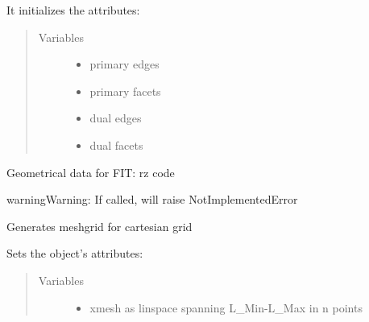 \documentclass[letterpaper,10pt,english]{sphinxmanual}
\begin{document}
\begin{fulllineitems}
\begin{fulllineitems}
It initializes the attributes:
\begin{quote}\begin{description}
\item[{Variables}] \leavevmode\begin{itemize}
\item {} 
 \textendash{} primary edges

\item {} 
 \textendash{} primary facets

\item {} 
 \textendash{} dual edges

\item {} 
 \textendash{} dual facets

\end{itemize}

\end{description}\end{quote}

\end{fulllineitems}


\begin{fulllineitems}
\label{\detokenize{FIT:FIT.FIT.geomMatricesBOR}}
Geometrical data for FIT: rz code

\begin{sphinxadmonition}{warning}{Warning:}
If called, will raise NotImplementedError
\end{sphinxadmonition}

\end{fulllineitems}


\begin{fulllineitems}
\label{\detokenize{FIT:FIT.FIT.makeMesh}}
Generates meshgrid for cartesian grid

Sets the object’s attributes:
\begin{quote}\begin{description}
\item[{Variables}] \leavevmode\begin{itemize}
\item {} 
 \textendash{} xmesh as linspace spanning L\_Min-L\_Max in n points


\end{itemize}
\end{description}
\end{quote}
\end{fulllineitems}
\end{fulllineitems}
\end{document}

